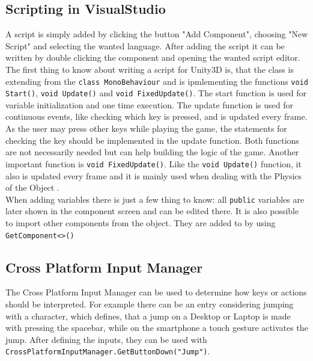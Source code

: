 \documentclass[conference]{IEEEtran}
\begin{document}
\lstset{language=[Sharp]C}

\subsection{Scripting in VisualStudio}

A script is simply added by clicking the button "Add Component", choosing "New Script" and selecting the wanted language. After adding the script it can be written by double clicking the component and opening the wanted script editor. \\
The first thing to know about writing a script for Unity3D is, that the class is extending from the \lstinline!class MonoBehaviour! and is ipmlementing the functions \lstinline!void Start()!, \lstinline!void Update()! and \lstinline!void FixedUpdate()!. 
The start function is used for variable initialization and one time execution.
The update function is used for continuous events, like checking which key is pressed, and is updated every frame\cite{b1}. As the user may press other keys while playing the game, the statements for checking the key should be implemented in the update function. Both functions are not necessarily needed but can help building the logic of the game.
Another important function is \lstinline!void FixedUpdate()!. Like the \lstinline!void Update()! function, it also is updated every frame and it is mainly used when dealing with the Physics of the Object \cite{b1}. \\
When adding variables there is just a few thing to know: all \lstinline!public! variables are later shown in the component screen and can be edited there. It is also possible to import other components from the object. They are added to by using \lstinline!GetComponent<>()!

\subsection{Cross Platform Input Manager}

The Cross Platform Input Manager can be used to determine how keys or actions should be interpreted. For example there can be an entry considering jumping with a character, which defines, that a jump on a Desktop or Laptop is made with pressing the spacebar, while on the smartphone a touch gesture activates the jump. After defining the inputs, they can be used with \lstinline!CrossPlatformInputManager.GetButtonDown("Jump")!. \\
\end{document}
